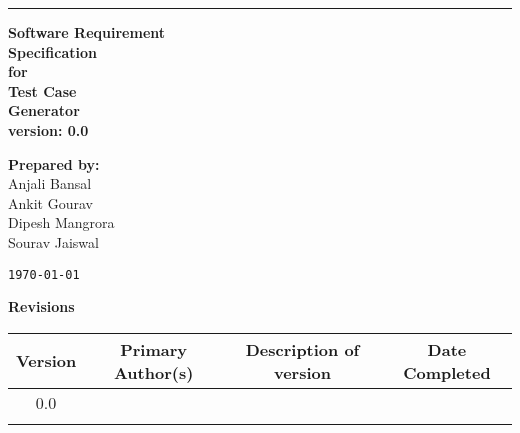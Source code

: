 \documentclass{article}
\begin{document}
\begin{titlepage}
    \hrule height 0.1cm
    \vspace{40pt}
    \begin{flushright}
        \Huge\textbf{Software Requirement\\Specification\\}
        \vspace{30pt}
        \Large\textbf{for\\}
        \vspace{25pt}
        \huge\textbf{Test Case\\Generator\\}
        \vspace{25pt}
        \Large\textbf{version: 0.0}
        \vspace{50pt}

        \vfill
        \begin{Large}
            \textbf{Prepared by:\\}
            Anjali Bansal\\
            Ankit Gourav\\
            Dipesh Mangrora\\
            Sourav Jaiswal\\
        \end{Large}
        \vfill
    \end{flushright}

    \texttt{\today}
\end{titlepage}
\pagebreak

\tableofcontents
\vfill

\begin{table}[H]
    \begin{flushleft}
        \Large\textbf{Revisions}
    \end{flushleft}
    \vspace{10pt}\normalsize
    \def\arraystretch{1.2}
    \centering
    \setlength{\tabcolsep}{25pt}
    \begin{tabular}{|c|c|c|c|}
        \hline
        Version & Primary Author(s) & Description of version & Date Completed\\
        \hline\hline
        0.0 & & & \\
        \hline
        & & & \\
        \hline
    \end{tabular}
\end{table}
\pagebreak
\end{document}
